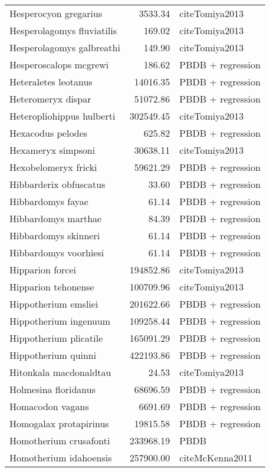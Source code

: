 \begin{table}[ht]
\begin{tabular}{lrl}
  Hesperocyon gregarius & 3533.34 & cite{Tomiya2013} \\ 
  Hesperolagomys fluviatilis & 169.02 & cite{Tomiya2013} \\ 
  Hesperolagomys galbreathi & 149.90 & cite{Tomiya2013} \\ 
  Hesperoscalops mcgrewi & 186.62 & PBDB + regression \\ 
  Heteraletes leotanus & 14016.35 & PBDB + regression \\ 
  Heteromeryx dispar & 51072.86 & PBDB + regression \\ 
  Heteropliohippus hulberti & 302549.45 & cite{Tomiya2013} \\ 
  Hexacodus pelodes & 625.82 & PBDB + regression \\ 
  Hexameryx simpsoni & 30638.11 & cite{Tomiya2013} \\ 
  Hexobelomeryx fricki & 59621.29 & PBDB + regression \\ 
  Hibbarderix obfuscatus & 33.60 & PBDB + regression \\ 
  Hibbardomys fayae & 61.14 & PBDB + regression \\ 
  Hibbardomys marthae & 84.39 & PBDB + regression \\ 
  Hibbardomys skinneri & 61.14 & PBDB + regression \\ 
  Hibbardomys voorhiesi & 61.14 & PBDB + regression \\ 
  Hipparion forcei & 194852.86 & cite{Tomiya2013} \\ 
  Hipparion tehonense & 100709.96 & cite{Tomiya2013} \\ 
  Hippotherium emsliei & 201622.66 & PBDB + regression \\ 
  Hippotherium ingenuum & 109258.44 & PBDB + regression \\ 
  Hippotherium plicatile & 165091.29 & PBDB + regression \\ 
  Hippotherium quinni & 422193.86 & PBDB + regression \\ 
  Hitonkala macdonaldtau & 24.53 & cite{Tomiya2013} \\ 
  Holmesina floridanus & 68696.59 & PBDB + regression \\ 
  Homacodon vagans & 6691.69 & PBDB + regression \\ 
  Homogalax protapirinus & 19815.58 & PBDB + regression \\ 
  Homotherium crusafonti & 233968.19 & PBDB \\ 
  Homotherium idahoensis & 257900.00 & cite{McKenna2011} \\ 

\end{tabular}
\end{table}
